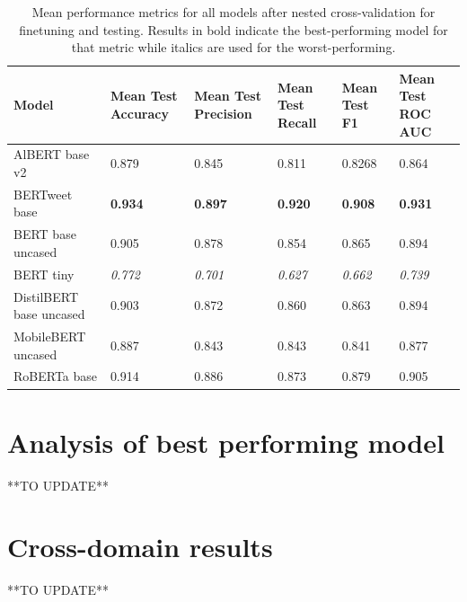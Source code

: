\begin{table}[htbp]
    \centering
    \begin{tabularx}{\textwidth}{|l|X|X|X|X|X|}
        \hline
        \rowcolor[gray]{0.7}
        \textbf{Model}          & \textbf{Mean Test Accuracy} & \textbf{Mean Test Precision} & \textbf{Mean Test Recall} & \textbf{Mean Test F1} & \textbf{Mean Test ROC AUC} \\
        \hline
        AlBERT base v2          & 0.879                       & 0.845                        & 0.811                     & 0.8268                & 0.864                      \\
        BERTweet base           & \textbf{0.934}              & \textbf{0.897}               & \textbf{0.920}            & \textbf{0.908}        & \textbf{0.931}             \\
        BERT base uncased       & 0.905                       & 0.878                        & 0.854                     & 0.865                 & 0.894                      \\
        BERT tiny               & \textit{0.772}              & \textit{0.701}               & \textit{0.627}            & \textit{0.662}        & \textit{0.739}             \\
        DistilBERT base uncased & 0.903                       & 0.872                        & 0.860                     & 0.863                 & 0.894                      \\
        MobileBERT uncased      & 0.887                       & 0.843                        & 0.843                     & 0.841                 & 0.877                      \\
        RoBERTa base            & 0.914                       & 0.886                        & 0.873                     & 0.879                 & 0.905                      \\
        \hline
    \end{tabularx}
    \caption{Mean performance metrics for all models after nested cross-validation for finetuning and testing. Results in bold indicate the best-performing model for that metric while italics are used for the worst-performing.}
    \label{tab: model_mean_metrics}
\end{table}

\section{Analysis of best performing model}
**TO UPDATE**

\section{Cross-domain results}
**TO UPDATE**